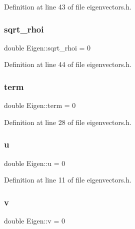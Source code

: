 Definition at line 43 of file eigenvectors.\+h.

\mbox{\label{classEigen_a9b648c2ff2e86e097527249afc860992}} 
\subsubsection{\texorpdfstring{sqrt\+\_\+rhoi}{sqrt\_rhoi}}
{\footnotesize\ttfamily double Eigen\+::sqrt\+\_\+rhoi = 0\hspace{0.3cm}{\ttfamily [private]}}



Definition at line 44 of file eigenvectors.\+h.

\mbox{\label{classEigen_a90d6d3a6b61e696c11a2e2332b1ad776}} 
\subsubsection{\texorpdfstring{term}{term}}
{\footnotesize\ttfamily double Eigen\+::term = 0\hspace{0.3cm}{\ttfamily [private]}}



Definition at line 28 of file eigenvectors.\+h.

\mbox{\label{classEigen_a9f7b7ec895023203196bfb4b12b2697c}} 
\subsubsection{\texorpdfstring{u}{u}}
{\footnotesize\ttfamily double Eigen\+::u = 0\hspace{0.3cm}{\ttfamily [private]}}



Definition at line 11 of file eigenvectors.\+h.

\mbox{\label{classEigen_a816699c51e29012ae53e5fb3096123ca}} 
\subsubsection{\texorpdfstring{v}{v}}
{\footnotesize\ttfamily double Eigen\+::v = 0\hspace{0.3cm}{\ttfamily [private]}}



